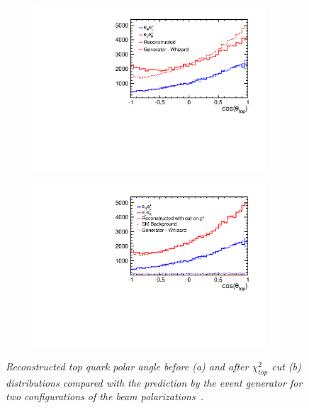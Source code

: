 \begin{figure}[H]
	\centering
	\begin{subfigure}{0.5\textwidth}
		\includegraphics[width=0.95\textwidth]{ILD/graphics/EPS_AFB_nocut.pdf}
		\caption{\label{fig:ILCTOPAFB_a_3} }
	\end{subfigure}%
	\begin{subfigure}{0.5\textwidth}
		\centering
		\includegraphics[width=0.95\textwidth]{ILD/graphics/AFB_wbkg_chi2cut.pdf}
		\caption{\label{fig:ILCTOPAFB_b_3} }
	\end{subfigure}
	\caption{\sl Reconstructed top quark polar angle before (a) and after $\chi^2_{top}$ cut (b) distributions compared with the prediction by the event generator for two configurations of the beam polarizations~\cite{bib:ILCTOP}. }
	
	\label{fig:ILCTOPAFB}
\end{figure}

